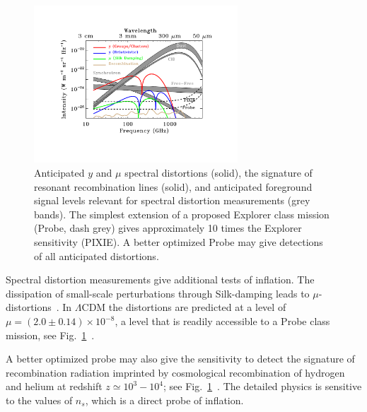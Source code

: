 \begin{figure}[ht!]
\hspace{-0.2in}
\parbox{4.0in}{\centerline {
\includegraphics[width=3.0in]{Figures/probe_spectral_foregrounds_v3.pdf} } }
\hspace{-0.05in}
\parbox{2.5in}{
\caption{ \small \setlength{\baselineskip}{0.95\baselineskip}
Anticipated $y$ and $\mu$ spectral distortions (solid), the signature of resonant recombination lines (solid), and anticipated foreground 
signal levels relevant for spectral distortion measurements (grey bands). 
The simplest extension of a proposed
Explorer class mission (Probe, dash grey) gives approximately 10 times the Explorer sensitivity (PIXIE). 
A better optimized Probe may give detections of all anticipated distortions. 
\label{fig:distortions} } }
\vspace{-0.1in}
\end{figure}

Spectral distortion measurements give additional tests of inflation. The dissipation of small-scale 
perturbations through Silk-damping leads to $\mu$-distortions~\cite{Sunyaev1970diss, Daly1991, Hu1994, Chluba2012}. 
In $\Lambda$CDM the distortions are predicted at a level of $\mu=(2.0\pm0.14)\times 10^{-8}$, a level that 
is readily accessible to a Probe class mission, see Fig.~\ref{fig:distortions}~\cite{Chluba2012, Chluba2016LCDM}. 

A better optimized probe may also give the sensitivity to detect the signature of recombination 
radiation imprinted by cosmological recombination of hydrogen and helium 
at redshift $z\simeq 10^3-10^4$; see Fig.~\ref{fig:distortions}~\citep{Sunyaev2009, Chluba2016}. 
The detailed physics is sensitive to the values of $n_{s}$, which is a direct probe of inflation. 



